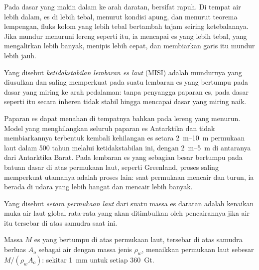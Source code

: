 Pada dasar yang makin dalam ke arah daratan,  bersifat rapuh. Di
tempat air lebih dalam, es di  lebih tebal, menurut kondisi
apung, dan menurut teorema lempengan, fluks kolom yang lebih tebal bertambah
tajam seiring ketebalannya. Jika  mundur menuruni lereng seperti
itu, ia mencapai es yang lebih tebal, yang mengalirkan lebih banyak, menipis lebih cepat, dan
membiarkan garis itu mundur lebih jauh.

\begin{definition}\label{def:b3:glaciology:misi}
Yang disebut \emph{ketidakstabilan lembaran es laut}
(MISI) adalah mundurnya  yang diusulkan dan saling memperkuat pada suatu
lembaran es yang bertumpu pada dasar yang miring ke arah pedalaman: tanpa
penyangga paparan es,  pada dasar seperti itu secara inheren
tidak stabil hingga mencapai dasar yang miring naik.
\end{definition}

Paparan es dapat menahan  di tempatnya bahkan pada lereng yang menurun.
Model yang menghilangkan seluruh paparan es Antarktika dan tidak membiarkannya
terbentuk kembali kehilangan es setara \qtyrange{2}{10}{m} permukaan laut dalam 500
tahun melalui ketidakstabilan ini, dengan \qtyrange{2}{5}{m} di antaranya dari Antarktika
Barat. Pada lembaran es yang sebagian besar bertumpu pada batuan dasar di atas permukaan laut,
seperti Greenland, proses saling memperkuat utamanya adalah proses lain: saat
permukaan mencair dan turun, ia berada di udara yang lebih hangat dan mencair lebih banyak.

\begin{definition}\label{def:b3:glaciology:sle}
Yang disebut \emph{setara permukaan laut} dari suatu massa
es daratan adalah kenaikan muka air laut global rata-rata yang akan
ditimbulkan oleh pencairannya jika air itu tersebar di atas samudra saat ini.
\end{definition}

\begin{proposition}\label{prop:b3:glaciology:sle}
Massa $M$ es yang bertumpu di atas permukaan laut, tersebar di atas samudra berluas
$A_o$ sebagai air dengan massa jenis $\rho_w$, menaikkan permukaan laut sebesar $M/(\rho_wA_o)$:
sekitar \qty{1}{mm} untuk setiap \qty{360}{Gt}.
\end{proposition}

